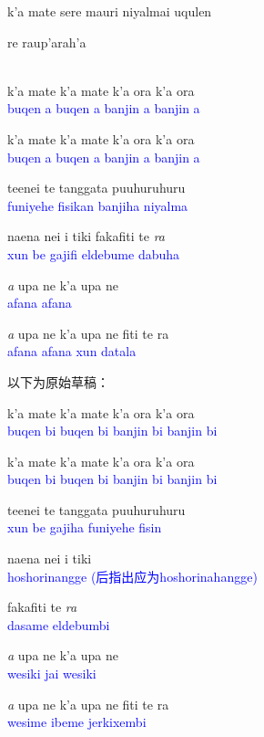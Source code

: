 \documentclass{article}
\newcommand{\blue}[1]{%
    \textcolor{blue}{#1}%
}
\begin{document}
\fancyhf{}
\pagestyle{fancy}
\lhead{\thepage}%
\chead{}%
\rhead{}
\lfoot{}
\cfoot{}%
\rfoot{}

\renewcommand{\headrulewidth}{0mm}
\renewcommand{\footrulewidth}{0mm}

{\Large k'a mate sere mauri niyalmai uqulen }

re raup'arah'a

~\\

k'a mate k'a mate k'a ora k'a ora\\
\blue{buqen a buqen a banjin a banjin a}

k'a mate k'a mate k'a ora k'a ora\\
\blue{buqen a buqen a banjin a banjin a}

teenei te tanggata puuhuruhuru\\
\blue{funiyehe fisikan banjiha niyalma}

naena nei i tiki fakafiti te \emph{ra}\\
\blue{xun be gajifi eldebume dabuha}

\emph{a} upa ne k'a upa ne \\
\blue{afana afana}

\emph{a} upa ne k'a upa ne fiti te ra\\
\blue{afana afana xun datala}

\pagebreak

以下为原始草稿：

k'a mate k'a mate k'a ora k'a ora\\
\blue{buqen bi buqen bi banjin bi banjin bi}

k'a mate k'a mate k'a ora k'a ora\\
\blue{buqen bi buqen bi banjin bi banjin bi}

teenei te tanggata puuhuruhuru\\
\blue{xun be gajiha funiyehe fisin}

naena nei i tiki\\
\blue{hoshorinangge (后指出应为hoshorinahangge)}

fakafiti te \emph{ra}\\
\blue{dasame eldebumbi}

\emph{a} upa ne k'a upa ne \\
\blue{wesiki jai wesiki}

\emph{a} upa ne k'a upa ne fiti te ra\\
\blue{wesime ibeme jerkixembi}
\end{document}
